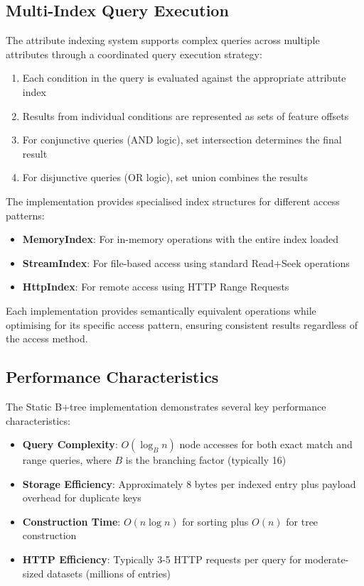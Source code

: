 \subsection{Multi-Index Query Execution}
\label{methodology:attribute_index:multi_index_query}

The attribute indexing system supports complex queries across multiple attributes through a coordinated query execution strategy:

\begin{enumerate}
    \item Each condition in the query is evaluated against the appropriate attribute index
    \item Results from individual conditions are represented as sets of feature offsets
    \item For conjunctive queries (AND logic), set intersection determines the final result
    \item For disjunctive queries (OR logic), set union combines the results
\end{enumerate}

The implementation provides specialised index structures for different access patterns:

\begin{itemize}
    \item \textbf{MemoryIndex}: For in-memory operations with the entire index loaded
    \item \textbf{StreamIndex}: For file-based access using standard Read+Seek operations
    \item \textbf{HttpIndex}: For remote access using HTTP Range Requests
\end{itemize}

Each implementation provides semantically equivalent operations while optimising for its specific access pattern, ensuring consistent results regardless of the access method.

\subsection{Performance Characteristics}
\label{methodology:attribute_index:performance_characteristics}

The Static B+tree implementation demonstrates several key performance characteristics:

\begin{itemize}
    \item \textbf{Query Complexity}: $O(\log_B n)$ node accesses for both exact match and range queries, where $B$ is the branching factor (typically 16)
    \item \textbf{Storage Efficiency}: Approximately 8 bytes per indexed entry plus payload overhead for duplicate keys
    \item \textbf{Construction Time}: $O(n \log n)$ for sorting plus $O(n)$ for tree construction
    \item \textbf{HTTP Efficiency}: Typically 3-5 HTTP requests per query for moderate-sized datasets (millions of entries)
\end{itemize}

